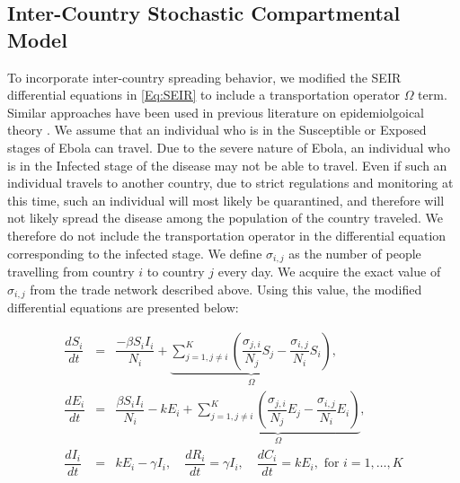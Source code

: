 \documentclass[10pt, journal,onecolumn]{IEEEtran}
\begin{document}
\subsection{{Inter-Country Stochastic Compartmental Model}}
\label{SubSec:WorldSystem}

To incorporate inter-country spreading behavior, we modified the SEIR differential equations in
\eqref{Eq:SEIR} to include a transportation operator $\Omega$ term. Similar approaches have been
used in previous literature on epidemiolgoical theory \citep{grais2003assessing,
balcan2010modeling}. We assume that an individual who is in the Susceptible or Exposed stages of
Ebola can travel. Due to the severe nature of Ebola, an individual who is in the Infected stage of
the disease may not be able to travel. Even if such an individual travels to another
country, due to strict regulations and monitoring at this time, such an individual will most likely be
quarantined, and therefore will not likely spread the disease among the population of the country
traveled. We therefore do not include the transportation operator in the differential equation
corresponding to the infected stage. We define $\sigma_{i,j}$ as the number of people travelling from
country $i$ to country $j$ every day. We acquire the exact value of  $\sigma_{i,j}$ from the trade
network described above. Using this value, the modified differential equations are
presented below:

\begin{eqnarray}
\dfrac{dS_{i}}{dt}&=&\dfrac{-\beta S_{i}I_{i}}{N_{i}}+\underset{\Omega}{\underbrace{\sum_{j=1,j\neq i}^{K}\left(\dfrac{\sigma_{j,i}}{N_{j}}S_{j}-\dfrac{\sigma_{i,j}}{N_{i}}S_{i}\right)}},\nonumber \\
\dfrac{dE_{i}}{dt}&=&\dfrac{\beta S_{i}I_{i}}{N_{i}}-kE_{i}+\underset{\Omega}{\underbrace{\sum_{j=1,j\neq i}^{K}\left(\dfrac{\sigma_{j,i}}{N_{j}}E_{j}-\dfrac{\sigma_{i,j}}{N_{i}}E_{i}\right)}},\nonumber \\
\dfrac{dI_{i}}{dt}&=& kE_{i}-\gamma I_{i},
\quad
\dfrac{dR_i}{dt}	=	\gamma I_i,
\quad
\dfrac{dC_i}{dt}	=	kE_i, \text{  for } i=1,\ldots, K
\label{Eq:SEIR_world}
\end{eqnarray}
\end{document}
